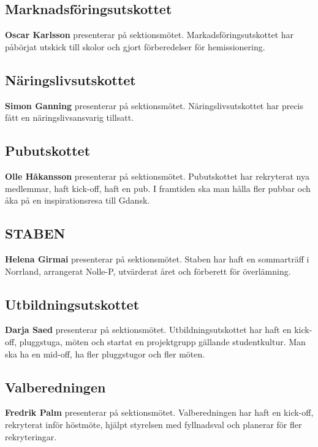 \documentclass[../protokoll_hostmote_2021.tex]{subfiles}
\begin{document}
\subsection{Marknadsföringsutskottet}
\textbf{Oscar Karlsson} presenterar på sektionsmötet. Markadsföringsutskottet har påbörjat utskick till skolor och gjort förberedelser för hemissionering.



\subsection{Näringslivsutskottet}
\textbf{Simon Ganning} presenterar på sektionsmötet. Näringslivsutskottet har precis fått en näringslivsansvarig tillsatt.



\subsection{Pubutskottet}
\textbf{Olle Håkansson} presenterar på sektionsmötet. Pubutskottet har rekryterat nya medlemmar, haft kick-off, haft en pub. I framtiden ska man hålla fler pubbar och åka på en inspirationsresa till Gdansk.



\subsection{STABEN}
\textbf{Helena Girmai} presenterar på sektionsmötet. Staben har haft en sommarträff i Norrland, arrangerat Nolle-P, utvärderat året och förberett för överlämning.



\subsection{Utbildningsutskottet}
\textbf{Darja Saed} presenterar på sektionsmötet. Utbildningsutskottet har haft en kick-off, pluggstuga, möten och startat en projektgrupp gällande studentkultur. Man ska ha en mid-off, ha fler pluggstugor och fler möten.


 
\subsection{Valberedningen}
\textbf{Fredrik Palm} presenterar på sektionsmötet. Valberedningen har haft en kick-off, rekryterat inför höstmöte, hjälpt styrelsen med fyllnadsval och planerar för fler rekryteringar.
\end{document}
